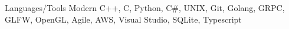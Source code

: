


\begin{cvskills}


\cvskill
{Languages/Tools} %
{Modern C++, C, Python, C\#, UNIX, Git, Golang, GRPC, GLFW, OpenGL, Agile, AWS, Visual Studio, SQLite, Typescript}


\end{cvskills}